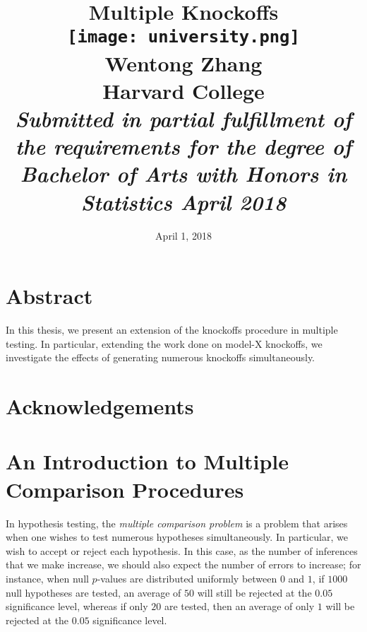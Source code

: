 \documentclass[11pt,reqno]{report}
\title{
	{\Huge \bf Multiple Knockoffs}\\ \vspace*{1cm}
	{\texttt{[image: university.png]}} \\
	{\huge Wentong Zhang \\ \LARGE Harvard College}\\ \vspace*{1cm}
	{\Large \it Submitted in partial fulfillment of the
requirements for the degree of Bachelor
of Arts with Honors in Statistics
April 2018}
}
\date{\Large April 1, 2018}
\theoremstyle{definition}
\numberwithin{equation}{section}
\begin{document}
\maketitle

\chapter*{Abstract}
In this thesis, we present an extension of the knockoffs procedure in multiple testing. In particular, extending the work done on model-X knockoffs, we investigate the effects of generating numerous knockoffs simultaneously. 

\chapter*{Acknowledgements}



\doublespacing
\tableofcontents
\singlespacing

\chapter{An Introduction to Multiple Comparison Procedures}
\label{chapter1}
In hypothesis testing, the \emph{multiple comparison problem} is a problem that arises when one wishes to test numerous hypotheses simultaneously. In particular, we wish to accept or reject each hypothesis. In this case, as the number of inferences that we make increase, we should also expect the number of errors to increase; for instance, when null $p$-values are distributed uniformly between $0$ and $1$, if $1000$ null hypotheses are tested, an average of $50$ will still be rejected at the $0.05$ significance level, whereas if only $20$ are tested, then an average of only $1$ will be rejected at the $0.05$ significance level.
\end{document}
